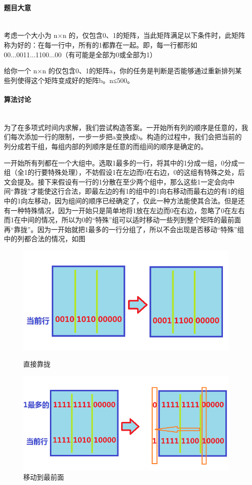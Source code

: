 \documentclass[UTF8]{ctexart}
\newcommand{\myparagraph}[1]{\paragraph{#1}\mbox{}\\}
\theoremstyle{nonumberplain}
\begin{document}
		\myparagraph{题目大意}
		
			考虑一个大小为 n×n 的，仅包含0、1的矩阵，当此矩阵满足以下条件时，此矩阵称为好的：在每一行中，所有的1都靠在一起。即，每一行都形如00...0011...1100...00（有可能是全部为0或全部为1）
		
			给你一个 n×n 的仅包含0、1的矩阵a，你的任务是判断是否能够通过重新排列某些列使得这个矩阵变成好的矩阵b。n≤500。
			
		\myparagraph{算法讨论}
		
			为了在多项式时间内求解，我们尝试构造答案。一开始所有列的顺序是任意的，我们每次添加一行的限制，一步一步把a变换成b。构造的过程中，我们会把当前的列分成若干组，每组内部的列顺序是任意的而组间的顺序是确定的。
		
			一开始所有列都在一个大组中。选取1最多的一行，将其中的1分成一组，0分成一组（全1的行要特殊处理），不妨假设1在左边而0在右边，0的这组有特殊之处，后文会提及。接下来假设有一行的1分散在至少两个组中，那么这些1一定会向中间“靠拢”才能使这行合法，即最左边的有1的组中的1向右移动而最右边的有1的组中的1向左移动，因为组间的顺序已经确定了，仅此一种方法能使其合法。但是还有一种特殊情况，因为一开始只是简单地将1放在左边而0在右边，忽略了0在左右而1在中间的情况，所以为0的“特殊”组可以适时移动一些列到整个矩阵的最前面再“靠拢”。因为一开始就把1最多的一行分组了，所以不会出现是否移动“特殊”组中的列都合法的情况，如图
		
			\begin{figure}[ht]
				\centering
				\begin{minipage}{.45\textwidth}
					\centering
					\includegraphics[width=\textwidth]{_cf243e/fig1.png}
					\caption{直接靠拢}
				\end{minipage}
				\begin{minipage}{.45\textwidth}
					\centering
					\includegraphics[width=\textwidth]{_cf243e/fig2.png}
					\caption{移动到最前面}
				\end{minipage}
			\end{figure}
		
\end{document}
